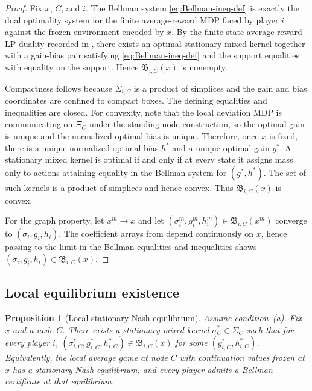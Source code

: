\documentclass[12pt]{article}
\newtheorem{proposition}[theorem]{Proposition}
\theoremstyle{definition}
\newcommand{\1}{\mathbf{1}}
\begin{document}
\begin{proof}
Fix $x$, $C$, and $i$.  The Bellman system
\eqref{eq:Bellman-ineq-def} is exactly the dual optimality system for the finite
average-reward MDP faced by player $i$ against the frozen environment encoded by
$x$.  By the finite-state average-reward LP duality recorded in
, there exists an optimal stationary mixed kernel together
with a gain-bias pair satisfying \eqref{eq:Bellman-ineq-def} and the support
equalities with equality on the support.  Hence $\mathfrak B_{i,C}(x)$ is
nonempty.

Compactness follows because $\Sigma_{i,C}$ is a product of simplices and the gain
and bias coordinates are confined to compact boxes.  The defining equalities and
inequalities are closed.  For convexity, note that the local deviation MDP is
communicating on $\Xi_C$ under the standing node construction, so the optimal gain is
unique and the normalized optimal bias is unique.  Therefore, once $x$ is fixed,
there is a unique normalized optimal bias $h^*$ and a unique optimal gain $g^*$.  A
stationary mixed kernel is optimal if and only if at every state it assigns mass
only to actions attaining equality in the Bellman system for $(g^*,h^*)$.  The set
of such kernels is a product of simplices and hence convex.  Thus
$\mathfrak B_{i,C}(x)$ is convex.

For the graph property, let $x^m\to x$ and let
$(\sigma_i^m,g_i^m,h_i^m)\in \mathfrak B_{i,C}(x^m)$ converge to
$(\sigma_i,g_i,h_i)$.  The coefficient arrays from
 depend continuously on $x$, hence passing to the limit in
the Bellman equalities and inequalities shows
$(\sigma_i,g_i,h_i)\in\mathfrak B_{i,C}(x)$.
\end{proof}

\subsection{Local equilibrium existence}

\begin{proposition}[Local stationary Nash equilibrium]
\label{prop:local-equilibrium}
Assume condition~\textnormal{(a)}.  Fix $x$ and a node $C$.  There exists a stationary mixed kernel
$\sigma_C^*\in\Sigma_C$ such that for every player $i$,
$(\sigma_{i,C}^*,g_{i,C}^*,h_{i,C}^*)\in \mathfrak B_{i,C}(x)$ for some
$(g_{i,C}^*,h_{i,C}^*)$.  Equivalently, the local average game at node $C$ with
continuation values frozen at $x$ has a stationary Nash equilibrium, and every
player admits a Bellman certificate at that equilibrium.
\end{proposition}
\end{document}

